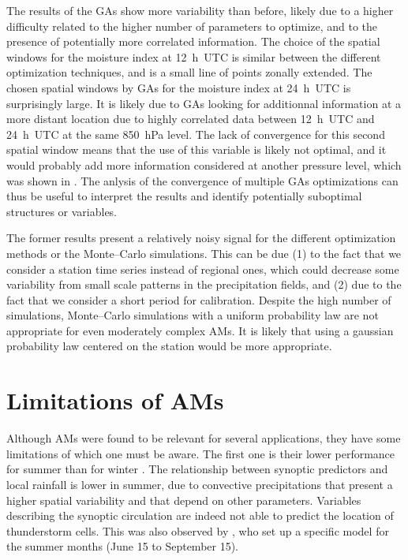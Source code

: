 \documentclass[review]{elsarticle}
\begin{document}
The results of the GAs show more variability than before, likely due to a higher difficulty related to the higher number of parameters to optimize, and to the presence of potentially more correlated information. The choice of the spatial windows for the moisture index at 12~h~UTC is similar between the different optimization techniques, and is a small line of points zonally extended. The chosen spatial windows by GAs for the moisture index at 24~h~UTC is surprisingly large. It is likely due to GAs looking for additionnal information at a more distant location due to highly correlated data between 12~h~UTC and 24~h~UTC at the same 850~hPa level. The lack of convergence for this second spatial window means that the use of this variable is likely not optimal, and it would probably add more information considered at another pressure level, which was shown in \citet{Horton2018a}. The anlysis of the convergence of multiple GAs optimizations can thus be useful to interpret the results and identify potentially suboptimal structures or variables.

The former results present a relatively noisy signal for the different optimization methods or the Monte--Carlo simulations. This can be due (1) to the fact that we consider a station time series instead of regional ones, which could decrease some variability from small scale patterns in the precipitation fields, and (2) due to the fact that we consider a short period for calibration. Despite the high number of simulations, Monte--Carlo simulations with a uniform probability law are not appropriate for even moderately complex AMs. It is likely that using a gaussian probability law centered on the station would be more appropriate.


\section{Limitations of AMs}
\label{sec:limitations}

Although AMs were found to be relevant for several applications, they have some limitations of which one must be aware. The first one is their lower performance for summer than for winter \citep{Bliefernicht2010}. The relationship between synoptic predictors and local rainfall is lower in summer, due to convective precipitations that present a higher spatial variability and that depend on other parameters. Variables describing the synoptic circulation are indeed not able to predict the location of thunderstorm cells. This was also observed by \citet{BenDaoud2010}, who set up a specific model for the summer months (June 15 to September 15).
\end{document}
